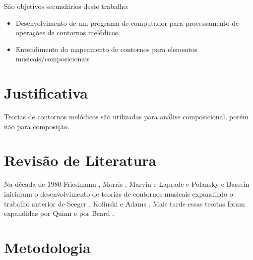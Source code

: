 \documentclass{article}
\begin{document}
São objetivos secundários deste trabalho:

\begin{itemize}
\item Desenvolvimento de um programa de computador para processamento
  de operações de contornos melódicos.
\item Entendimento do mapeamento de contornos para elementos
  musicais/composicionais
\end{itemize}

\section{Justificativa}
\label{sec:justificativa}


Teorias de contornos melódicos são utilizadas para análise
composicional, porém não para composição.

\section{Revisão de Literatura}
\label{sec:revis-de-liter}

Na década de 1980 Friedmann
\cite{friedmann85:_method_discus_contour,friedmann1987rmc}, Morris
\cite{morris1987cpc}, Marvin e Laprade
\cite{marvin87:_relat_music_contour} e Polansky e Bassein
\cite{polansky92:_possib_impos_melod} iniciaram o desenvolvimento de
teorias de contornos musicais expandindo o trabalho anterior de Seeger
\cite{seeger1960mml}, Kolinski \cite{kolinkski65:_struc_melod_movem} e
Adams \cite{adams1976mct}. Mais tarde essas teorias foram expandidas
por Quinn \cite{quinn97:_fuzzy_exten_theor_contour} e por Beard
\cite{beard2003cmm}.

\section{Metodologia}
\label{sec:metodologia}
\end{document}
